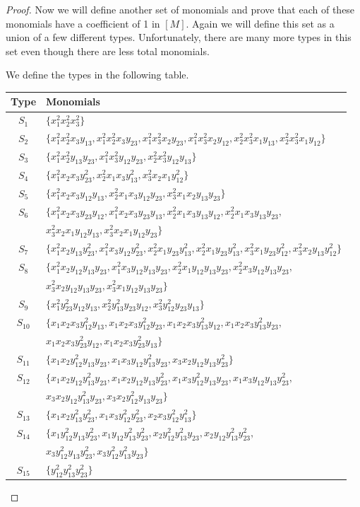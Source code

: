 \documentclass[12pt]{article}
\theoremstyle{plain}
\theoremstyle{definition}
\begin{document}
\begin{proof}
Now we will define another set of monomials and prove that each of these monomials have a coefficient of 1 in $[M]$. Again we will define this set as a union of a few different types. Unfortunately, there are many more types in this set even though there are less total monomials. 

We define the types in the following table.

\begin{longtable}{|c|l|}
\hline
Type & Monomials\\
\hline
$S_1$ & $\{x_1^2x_2^2x_3^2\}$\\
\hline
$S_2$ & $\{x_1^2x_2^2x_3y_{13},x_1^2x_2^2x_3y_{23},x_1^2x_3^2x_2y_{23},x_1^2x_3^2x_2y_{12}, x_2^2x_3^2x_1y_{13},x_2^2x_3^2x_1y_{12}\}$\\
\hline   
$S_3$ & $\{x_1^2x_2^2y_{13}y_{23},x_1^2x_3^2y_{12}y_{23},x^2_2x_3^2y_{12}y_{13}\}$\\
\hline
$S_4$ & $\{ x_1^2x_2x_3y_{23}^2,x_2^2x_1x_3y_{13}^2,x_3^2x_2x_1y_{12}^2\}$\\
\hline
$S_5$ & $\{ x_1^2x_2x_3y_{12}y_{13},x_2^2x_1x_3y_{12}y_{23},x_3^2x_1x_2y_{13}y_{23}\}$\\
\hline
$S_6$ & $\{ x_1^2x_2x_3y_{23}y_{12},x_1^2x_2x_3y_{23}y_{13},x_2^2x_1x_3y_{13}y_{12},x_2^2x_1x_3y_{13}y_{23},$ \\
& $x_3^2x_2x_1y_{12}y_{13},x_3^2x_2x_1y_{12}y_{23}\}$\\
\hline
$S_7$ & $\{ x_1^2x_2y_{13}y_{23}^2,x_1^2x_3y_{12}y_{23}^2,x_2^2x_1y_{23}y_{13}^2,x_2^2x_1y_{23}y_{13}^2,x_3^2x_1y_{23}y_{12}^2,x_3^2x_2y_{13}y_{12}^2\}$\\
\hline
$S_8$ & $\{ x_1^2x_2y_{12}y_{13}y_{23},x_1^2x_3y_{12}y_{13}y_{23}, x_2^2x_1y_{12}y_{13}y_{23},x_2^2x_3y_{12}y_{13}y_{23},$\\
& $x_3^2x_2y_{12}y_{13}y_{23},x_3^2x_1y_{12}y_{13}y_{23}\}$\\
\hline
$S_9$ & $\{x_1^2y_{23}^2y_{12}y_{13},x_2^2y_{13}^2y_{23}y_{12},x_3^2y_{12}^2y_{23}y_{13}\}$ \\
\hline
$S_{10}$ & $\{ x_1x_2x_3y_{12}^2y_{13},x_1x_2x_3y_{12}^2y_{23},x_1x_2x_3y_{13}^2y_{12},x_1x_2x_3y_{13}^2y_{23},$\\
& $x_1x_2x_3y_{23}^2y_{12},x_1x_2x_3y_{23}^2y_{13}\}$\\
\hline
$S_{11}$ & $\{ x_1x_2y_{12}^2y_{13}y_{23},x_1x_3y_{12}y_{13}^2y_{23},x_3x_2y_{12}y_{13}y_{23}^2\}$\\
\hline
$S_{12}$& $\{x_1x_2y_{12}y_{13}^2y_{23},x_1x_2y_{12}y_{13}y_{23}^2,x_1x_3y_{12}^2y_{13}y_{23},x_1x_3y_{12}y_{13}y_{23}^2,$\\
& $x_3x_2y_{12}y_{13}^2y_{23},x_3x_2y_{12}^2y_{13}y_{23} \}$\\
\hline
$S_{13}$ & $\{ x_1x_2y_{13}^2y_{23}^2,x_1x_3y_{12}^2y_{23}^2,x_2x_3y_{12}^2y_{13}^2\}$\\
\hline
$S_{14}$ & $ \{ x_1y_{12}^2y_{13}y_{23}^2,x_1y_{12}y_{13}^2y_{23}^2, x_2y_{12}^2y_{13}^2y_{23},x_2y_{12}y_{13}^2y_{23}^2, $\\
& $x_3y_{12}^2y_{13}y_{23}^2,x_3y_{12}^2y_{13}^2y_{23}\}$\\
\hline
$S_{15}$ & $\{y_{12}^2y_{13}^2y_{23}^2\}$\\
\hline
\end{longtable}


\end{proof}
\end{document}
